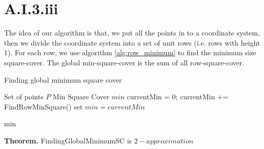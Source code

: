\section*{A.I.3.iii}
\label{a-1-3-3}

The idea of our algorithm is that, we put all the points in to a coordinate system, then we divide the coordinate system into a set of unit rows (i.e. rows with height 1). For each row, we use algorithm \ref{alg:row_minimum} to find the minimum size square-cover. The global min-square-cover is the sum of all row-square-cover.

\begin{algorithm}
  \caption{Finding global minimum square cover}
  \label{alg:global_minimum}
  \begin{algorithmic}
    \renewcommand{\algorithmicrequire}{\textbf{Input:}}
    \renewcommand{\algorithmicensure}{\textbf{Output:}}
    \algnewcommand{}
    \algnewcommand\Operation{\item[\algorithmicoperation]}
    \Require Set of points $P$
    \Ensure Min Square Cover $min$
    \Operation
    \State currentMin = 0;
    \State currentMin += FindRowMinSquare()
    \EndFor
    \State set $min = currentMin$
    
    \Return min
  \end{algorithmic}
\end{algorithm}

\textbf{Theorem.} FindingGlobalMinimumSC is $2-approximation$

